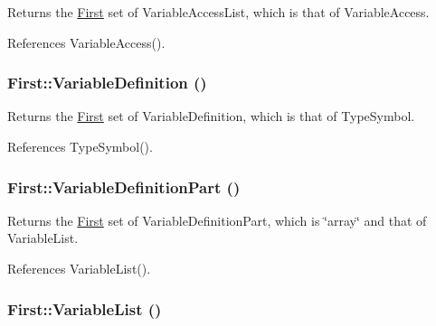 Returns the \hyperlink{classFirst}{First} set of VariableAccessList, which is that of VariableAccess. 



References VariableAccess().

\hypertarget{classFirst_aefcae573e31e01ae74204a6b9e44a36a}{
\subsubsection[{VariableDefinition}]{ First::VariableDefinition ()}}
\label{classFirst_aefcae573e31e01ae74204a6b9e44a36a}


Returns the \hyperlink{classFirst}{First} set of VariableDefinition, which is that of TypeSymbol. 



References TypeSymbol().

\hypertarget{classFirst_a9c91c3f1c5d87c2356cacf6e44200764}{
\subsubsection[{VariableDefinitionPart}]{ First::VariableDefinitionPart ()}}
\label{classFirst_a9c91c3f1c5d87c2356cacf6e44200764}


Returns the \hyperlink{classFirst}{First} set of VariableDefinitionPart, which is \char`\"{}array\char`\"{} and that of VariableList. 



References VariableList().

\hypertarget{classFirst_a53ff9cbd12b57f99e5b9b96f38d100b8}{
\subsubsection[{VariableList}]{ First::VariableList ()}}
\label{classFirst_a53ff9cbd12b57f99e5b9b96f38d100b8}


